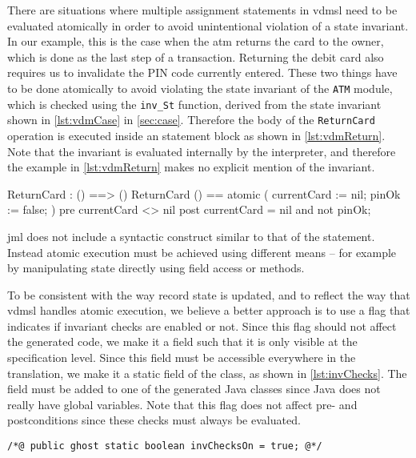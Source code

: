 There are situations where multiple assignment statements in
\ac{vdmsl} need to be evaluated atomically in order to avoid
unintentional violation of a state invariant. In our example, this is
the case when the \ac{atm} returns the card to the owner, which is
done as the last step of a transaction. Returning the debit card also
requires us to invalidate the PIN code currently entered. These two
things have to be done atomically to avoid violating the state
invariant of the \texttt{ATM} module, which is checked using the
\texttt{inv\_St} function, derived from the state invariant shown in
\autoref{lst:vdmCase} in \autoref{sec:case}. Therefore the body of the
\texttt{ReturnCard} operation is executed inside an 
statement block as shown in \autoref{lst:vdmReturn}. Note that the
invariant is evaluated internally by the interpreter, and therefore
the example in \autoref{lst:vdmReturn} makes no explicit mention of
the invariant.

\begin{vdmsl}[style=customVdm,caption={Removal of the debit card from
the \ac{atm} in \ac{vdmsl}.},label={lst:vdmReturn}]
ReturnCard : () ==> ()
ReturnCard () ==
atomic (
 currentCard := nil;
 pinOk := false;
)
pre currentCard <> nil
post currentCard = nil and not pinOk;
\end{vdmsl}

\ac{jml} does not include a syntactic construct similar to that of the
 statement. Instead atomic execution must be achieved using
different means -- for example by manipulating state directly using
field access or  methods.

To be consistent with the way record state is updated, and
to reflect the way that \ac{vdmsl} handles atomic execution, we
believe a better approach is to use a flag that indicates if invariant
checks are enabled or not. Since this flag should not affect the
generated code, we make it a  field such that it is only
visible at the specification level. Since this  field must
be accessible everywhere in the translation, we make it a static field
of the class, as shown in \autoref{lst:invChecks}. The 
field must be added to one of the generated Java classes since Java
does not really have global variables. Note that this flag does not
affect pre- and postconditions since these checks must always be
evaluated.

\begin{lstlisting}[style=customJml,caption={Ghost field used to
control invariant checking.},label={lst:invChecks}]
/*@ public ghost static boolean invChecksOn = true; @*/
\end{lstlisting}

